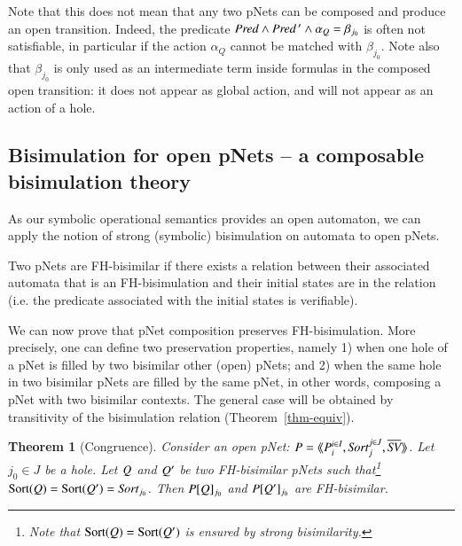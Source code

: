 \documentclass{elsarticle}
\newcommand{\TODO}[1]{\textcolor{red}{\textbf{[TODO:#1]}}}
\newtheorem{thm}{Theorem}
\begin{document}
Note that this does not mean that any two pNets can be composed and produce an open 
transition. Indeed, the predicate $\Pred\land\Pred\,'\land \alpha_Q=\beta_{j_0}$ is often not  satisfiable, in particular if the action  $\alpha_Q$ cannot be matched with $\beta_{j_0}$.
Note also that $\beta_{j_0}$ is  only used as an intermediate term inside formulas in the composed open transition: it 
does not appear as global action, and will not appear as an action of a hole.


\subsection{Bisimulation for open pNets -- a composable bisimulation theory}
\label{section:bisimulation-PN}
As  our symbolic operational semantics provides an open automaton, we can apply the notion of
	strong (symbolic) bisimulation on automata to open pNets.
\begin{definition}\label{def:bisim-pnets}
Two pNets are FH-bisimilar if there exists a relation between their associated 
automata that is an FH-bisimulation and their initial states are in the relation (i.e. the predicate associated with the initial states is verifiable).
\end{definition}

We can now prove that pNet composition  preserves
FH-bisimulation. More precisely, one can define two preservation
properties, namely 1) when one hole of a pNet is filled by two bisimilar other (open) pNets; and 2) when the same hole in two bisimilar pNets are
filled by the same pNet, in other words, composing a pNet with two
bisimilar contexts. The general case will be obtained by
transitivity of the bisimulation relation (Theorem~\ref{thm-equiv}). 

\begin{thm}[Congruence]\label{thm-congr-eq}
	Consider an open pNet:
	$\pNet = \mylangle \pNet_i^{i\in I}, \Sort_j^{j\in J}, 
	\set{\symb{SV}}\myrangle$.
	Let $j_0\in J$ be a hole. Let $Q$ and $Q'$ be two FH-bisimilar pNets such that\footnote{Note that $\operatorname{Sort}(Q)=\operatorname{Sort}(Q')$ is 
	ensured by 
	strong bisimilarity.} 
	$\Sortop(\pNetQ)=\Sortop(\pNetQ')=\Sort_{j_0}$. Then 
	$P[Q]_{j_0}$ and 
	$P[Q']_{j_0}$ are FH-bisimilar.
\end{thm}
 
\end{document}
